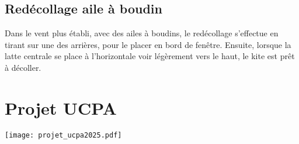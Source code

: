 \documentclass[11pt,a4paper]{report}
\begin{document}
\section{Redécollage aile à boudin}
Dans le vent plus établi, avec des ailes à boudins, le redécollage s'effectue
en tirant sur une des arrières, pour le placer en bord de fenêtre.
Ensuite, lorsque la latte centrale se place à l'horizontale voir légèrement
vers le haut, le kite est pr\^et à décoller.
\chapter{\small{Projet UCPA}\label{ucpa_projet}}
\texttt{[image: projet\_ucpa2025.pdf]}


\end{document}
